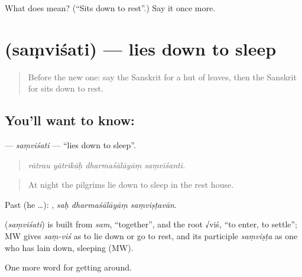 \begin{tcolorbox}[breakable,colback=teal!4,colframe=teal!35!black,title={Before you move on}]
What does  mean? (\textquotedblleft{}Sits down to rest\textquotedblright{}.) Say it once more.
\end{tcolorbox}
\section[\texorpdfstring{\sk{संविशति} (saṃviśati)}{संविशति (saṃviśati)}]{ (saṃviśati) — lies down to sleep}

\label{lesson:SA-C402-samvisati}



\begin{quote}
Before the new one: say the Sanskrit for a hut of leaves, then the Sanskrit for sits down to rest.
\end{quote}

\subsection*{You'll want to know: }
\textbf{} — \emph{saṃviśati} — \textquotedblleft{}lies down to sleep\textquotedblright{}.

\begin{quote}
   
\end{quote}

\begin{quote}
\emph{rātrau yātrikāḥ dharmaśālāyāṃ saṃviśanti.}
\end{quote}

\begin{quote}
At night the pilgrims lie down to sleep in the rest house.
\end{quote}

Past (he …):   , \emph{saḥ dharmaśālāyāṃ saṃviṣṭavān}.

\begin{cousinweb}
\textbf{} (\emph{saṃviśati}) is built from \emph{sam}, \textquotedblleft{}together\textquotedblright{}, and the root √viś, \textquotedblleft{}to enter, to settle\textquotedblright{}; MW gives \emph{saṃ-viś} as to lie down or go to rest, and its participle \emph{saṃviṣṭa} as one who has lain down, sleeping (MW).
\end{cousinweb}

\begin{grammarlens}[title={What you've built}]
One more word for getting around.
\end{grammarlens}

